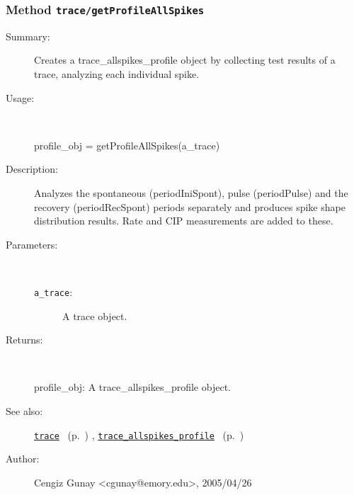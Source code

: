 \subsubsection[Method \texttt{getProfileAllSpikes}]{Method \texttt{trace/getProfileAllSpikes}}%
%
\label{ref_trace__getProfileAllSpikes}%
\hypertarget{ref_trace__getProfileAllSpikes}{}%
\begin{description}
\item[Summary:]Creates a trace\_allspikes\_profile object by collecting test results of a trace, analyzing each individual spike.
%
\item[Usage:]~%
\begin{lyxcode}%
profile\_obj = getProfileAllSpikes(a\_trace)
%
\end{lyxcode}%
%
\item[Description:]%
Analyzes the spontaneous (periodIniSpont), pulse (periodPulse) and the
 recovery (periodRecSpont) periods separately and produces spike shape
 distribution results. Rate and CIP measurements are added to these.
\item[Parameters:]~
\begin{description}%
\item[\texttt{a\_trace}:]
 A trace object.
\end{description}%
%
\item[Returns:
]~

	profile\_obj: A trace\_allspikes\_profile object.
%
%
\item[See also:]%
\hyperlink{ref_trace}{\texttt{trace}}%
\ (p.~\pageref{ref_trace})%
%
, \hyperlink{ref_trace_allspikes_profile}{\texttt{trace\_allspikes\_profile}}%
\ (p.~\pageref{ref_trace_allspikes_profile})%
%
%
\item[Author:]%
Cengiz Gunay <cgunay@emory.edu>, 2005/04/26
%
\end{description}
\methodline%

